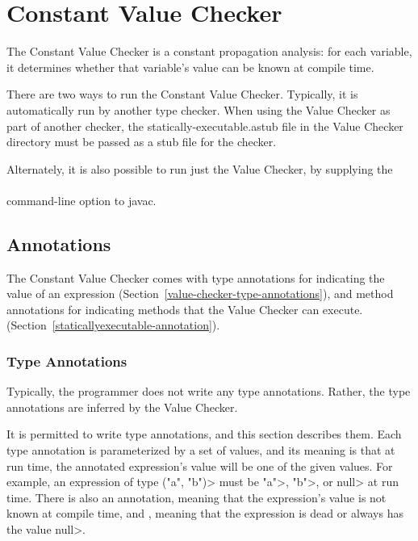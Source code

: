 \htmlhr
\chapter{Constant Value Checker\label{value-checker}}

The Constant Value Checker is a constant propagation analysis: for
each variable, it determines whether that variable's value can be
known at compile time.

There are two ways to run the Constant Value Checker.
Typically, it is automatically run by another type checker.
When using the Value Checker as part of another checker, the
statically-executable.astub file in the Value Checker directory must
be passed as a stub file for the checker.

Alternately, it is also possible to run just the Value Checker, by
supplying the \\
 \\
command-line option to javac.


\section{Annotations\label{value-checker-annotations}}

The Constant Value Checker comes with type annotations for indicating the
value of an expression (Section~\ref{value-checker-type-annotations}), and
method annotations for indicating methods that the Value Checker can execute.
(Section~\ref{staticallyexecutable-annotation}).


\subsection{Type Annotations\label{value-checker-type-annotations}}

Typically, the programmer does not write any type annotations.  Rather, the
type annotations are inferred by the Value Checker.

It is permitted to write type annotations, and this section describes them.
Each type annotation is parameterized by a set of values, and its meaning
is that at run time, the annotated expression's value will be one of the
given values.  For example, an expression of type 
\<("a", "b")> must be
\<"a">, \<"b">, or \<null> at run time.
There is also an  annotation,
meaning that the expression's value is not known at compile time, and 
, meaning that the expression
is dead or always has the value \<null>.

